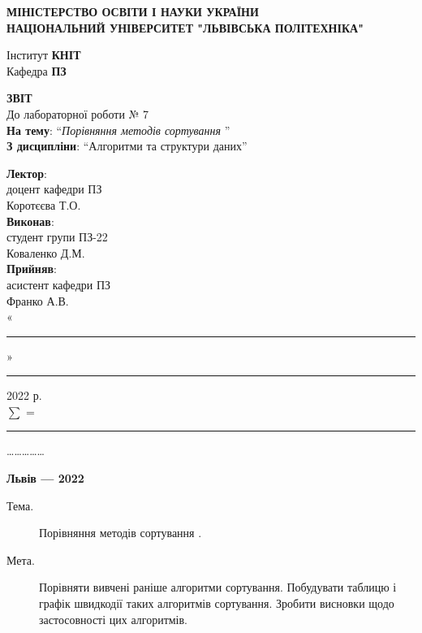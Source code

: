 \documentclass{article}
\newcommand\subject{Алгоритми та структури даних}
\newcommand\lecturer{доцент кафедри ПЗ\\Коротєєва Т.О.}
\newcommand\teacher{асистент кафедри ПЗ\\Франко А.В.}
\newcommand\mygroup{ПЗ-22}
\newcommand\lab{7}
\newcommand\theme{Порівняння методів сортування }
\newcommand\purpose{Порівняти вивчені раніше алгоритми сортування. Побудувати таблицю і графік швидкодії таких алгоритмів сортування. Зробити висновки щодо застосовності цих алгоритмів}
\begin{document}
	\begin{normalsize}
		\begin{titlepage}
			\thispagestyle{empty}
			\begin{center}
				\textbf{МІНІСТЕРСТВО ОСВІТИ І НАУКИ УКРАЇНИ\\
					НАЦІОНАЛЬНИЙ УНІВЕРСИТЕТ "ЛЬВІВСЬКА ПОЛІТЕХНІКА"}
			\end{center}
			\begin{flushright}
				Інститут \textbf{КНІТ}\\
				Кафедра \textbf{ПЗ}
			\end{flushright}
			\vspace{200pt}
			\begin{center}
				\textbf{ЗВІТ}\\
				\vspace{10pt}
				До лабораторної роботи № \lab\\
				\textbf{На тему}: “\textit{\theme}”\\
				\textbf{З дисципліни}: “\subject”
			\end{center}
			\vspace{112pt}
			\begin{flushright}
				
				\textbf{Лектор}:\\
				\lecturer\\
				\vspace{28pt}
				\textbf{Виконав}:\\
				
				студент групи \mygroup\\
				Коваленко Д.М.\\
				\vspace{28pt}
				\textbf{Прийняв}:\\
				
				\teacher\\
				
				\vspace{28pt}
				«\rule{1cm}{0.15mm}» \rule{1.5cm}{0.15mm} 2022 р.\\
				$\sum$ = \rule{1cm}{0.15mm}……………\\
				
			\end{flushright}
			\vspace{\fill}
			\begin{center}
				\textbf{Львів — 2022}
			\end{center}
		\end{titlepage}
		
		\begin{description}
			\item[Тема.] \theme.
			\item[Мета.] \purpose.
		\end{description}
		

\end{normalsize}
\end{document}
